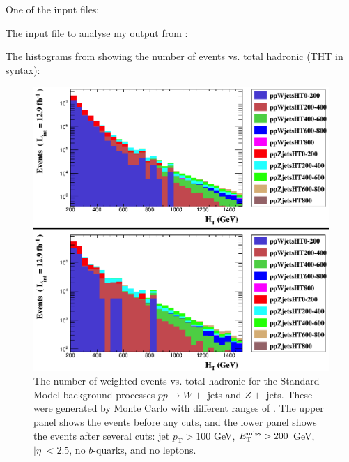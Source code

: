One of the \madgraph input files:



The \madanalysis input file to analyse my output from \madgraph:



The histograms from \madanalysis showing the number of events vs. total hadronic \HT (THT in \madanalysis syntax):

\begin{figure}[H]
\centering
\includegraphics[width=\textwidth]{./sec15/HT_HTranges.png}
\caption{The number of weighted events vs. total hadronic \HT for the Standard Model background processes $pp \rightarrow W +$ jets and $Z +$ jets. These were generated by Monte Carlo with different ranges of \HT. The upper panel shows the events before any cuts, and the lower panel shows the events after several cuts: jet $p_{\mathrm{T}} > 100$ GeV, $E_{\mathrm{T}}^{\text{miss}} > 200$ GeV, $|\eta| < 2.5$, no $b$-quarks, and no leptons.}
\end{figure}

